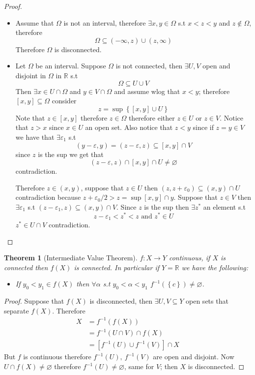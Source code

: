 \documentclass[11pt,a4paper]{article}
\theoremstyle{definition}
\theoremstyle{plain}
\newtheorem{theorem}[definition]{Theorem}
\theoremstyle{remark}
\newcommand{\R}{\mathbb{R}}
\renewcommand{\set}[1]{\left\{ #1 \right\}}
\begin{document}
\begin{proof}
    \begin{itemize}
        \item[$\implies$] Assume that $\Omega$ is not an interval, therefore $\exists x, y \in \Omega$ s.t $x < z < y$ and $z \not\in \Omega$, therefore 
        $$\Omega \subseteq (-\infty, z) \cup (z, \infty)$$
        Therefore $\Omega$ is disconnected. 

        \item[$\impliedby$] Let $\Omega$ be an interval. Suppose $\Omega$ is not connected, then $\exists U, V$ open and disjoint in $\Omega$ in $\R$ s.t 
        $$\Omega \subseteq U \cup V$$
        Then $\exists x \in U \cap \Omega$ and $y \in V \cap \Omega$ and assume wlog that $x < y$; therefore 
        $[x,y] \subseteq \Omega$ consider 
        $$z = \sup \set{[x,y] \cup U}$$
        Note that $z \in [x,y]$ therefore $z \in \Omega$ therefore either $z \in U$ or $z \in V$. Notice that $z > x$ since $x \in U$ an open set. 
        Also notice that $z < y$ since if $z = y \in V$ we have that $\exists \varepsilon_1$ s.t 
        $$(y - \varepsilon, y) = (z - \varepsilon, z) \subseteq [x,y] \cap V$$
        since $z$ is the sup we get that 
        $$(z - \varepsilon, z) \cap [x,y] \cap U \ne \varnothing$$
        contradiction.

        Therefore $z \in (x,y)$, suppose that $z \in U$ then $(z, z + \varepsilon_0) \subseteq (x,y) \cap U$ contradiction because 
        $z + \varepsilon_0 /2 > z = \sup [x,y] \cap y$. Suppose that $z \in V$ then $\exists \varepsilon_1$ s.t $(z - \varepsilon_1, z) \subseteq (x, y) \cap V$. 
        Since $z$ is the sup then $\exists z^*$ an element s.t 
        $$z - \varepsilon_1 < z^* < z \text{ and } z^* \in U$$
        $z^* \in U \cap V$ contradiction.   
    \end{itemize}
\end{proof}

\begin{theorem}[Intermediate Value Theorem]
    $f \colon X \to Y$ continuous, if $X$ is connected then $f(X)$ is connected. In particular if $Y = \R$ we have the following: 
    \begin{itemize}
        \item If $y_0 < y_1 \in f(X)$ then $\forall \alpha$ s.t $y_0 < \alpha < y_1$ $f^{-1} (\set{c}) \ne \varnothing$. 
    \end{itemize} 
\end{theorem}

\begin{proof}
    Suppose that $f(X)$ is disconnected, then $\exists U, V \subseteq Y$ open sets that separate $f(X)$. Therefore 
    \begin{align*}
        X &= f^{-1} (f(X)) \\
        &= f^{-1} (U \cap V) \cap f(X) \\
        &= \left[f^{-1} (U) \cup f^{-1} (V)\right] \cap X
    \end{align*}
    But $f$ is continuous therefore $f^{-1} (U), \ f^{-1} (V)$ are open and disjoint. Now $U \cap f(X) \ne \varnothing$ therefore 
    $f^{-1}(U) \ne \varnothing$, same for $V$; then $X$ is disconnected. 
\end{proof}
\end{document}

